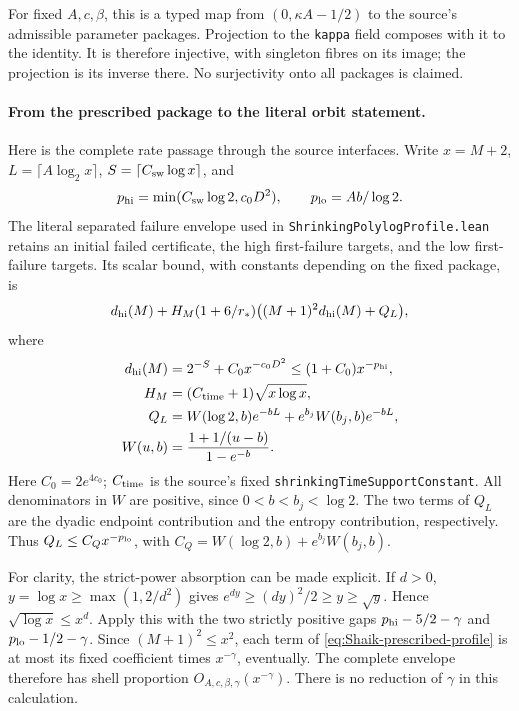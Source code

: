 For fixed \(A,c,\beta\), this is a typed map from
\((0,\kappa A-1/2)\) to the source's admissible parameter packages.
Projection to the \texttt{kappa} field composes with it to the identity.
It is therefore injective, with singleton fibres on its image; the
projection is its inverse there. No surjectivity onto all packages is claimed.

\paragraph{From the prescribed package to the literal orbit statement.}
Here is the complete rate passage through the source interfaces.
Write \(x=M+2\), \(L=\lceil A\log_2 x\rceil\),
\(S=\lceil C_{\rm sw}\log x\rceil\), and
\[
 p_{\rm hi}=\min(C_{\rm sw}\log2,c_0D^2),\qquad
 p_{\rm lo}=Ab/\log2.
\]
The literal separated failure envelope used in
\texttt{ShrinkingPolylogProfile.lean} retains an initial failed
certificate, the high first-failure targets, and the low first-failure
targets. Its scalar bound, with constants depending on the fixed
package, is
\begin{equation}\label{eq:Shaik-prescribed-profile}
 d_{\rm hi}(M)+H_M(1+6/r_*)\bigl((M+1)^2d_{\rm hi}(M)+Q_L\bigr),
\end{equation}
where
\[
 \begin{split}
 d_{\rm hi}(M)&=2^{-S}+C_0x^{-c_0D^2}
             \le(1+C_0)x^{-p_{\rm hi}},\\
 H_M&=(C_{\rm time}+1)\sqrt{x\log x},\\
 Q_L&=W(\log2,b)e^{-bL}+e^{b_j}W(b_j,b)e^{-bL},\\
 W(u,b)&=\frac{1+1/(u-b)}{1-e^{-b}} .
 \end{split}
\]
Here \(C_0=2e^{4c_0}\);
\(C_{\rm time}\) is the source's fixed
\texttt{shrinkingTimeSupportConstant}. All denominators in \(W\)
are positive, since \(0<b<b_j<\log2\).
The two terms of \(Q_L\) are the dyadic endpoint contribution and
the entropy contribution, respectively. Thus
\(Q_L\le C_Qx^{-p_{\rm lo}}\), with
\(C_Q=W(\log2,b)+e^{b_j}W(b_j,b)\).

For clarity, the strict-power absorption can be made explicit.
If \(d>0\), \(y=\log x\ge\max(1,2/d^2)\) gives
\(e^{dy}\ge(dy)^2/2\ge y\ge\sqrt y\).
Hence \(\sqrt{\log x}\le x^d\).
Apply this with the two strictly positive gaps
\(p_{\rm hi}-5/2-\gamma\) and \(p_{\rm lo}-1/2-\gamma\).
Since \((M+1)^2\le x^2\), each term of
\eqref{eq:Shaik-prescribed-profile} is at most its fixed coefficient
times \(x^{-\gamma}\), eventually. The complete envelope therefore
has shell proportion \(O_{A,c,\beta,\gamma}(x^{-\gamma})\).
There is no reduction of \(\gamma\) in this calculation.

